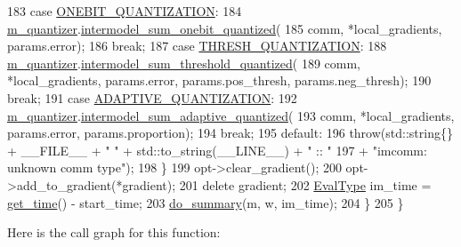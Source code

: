 \begin{DoxyCode}
183     \textcolor{keywordflow}{case} \hyperlink{classlbann_1_1lbann__callback__imcomm_acf7e894b3381e7f9b71020dc73594d6aa06f19090efbd982638c20bcb8a3c7d33}{ONEBIT\_QUANTIZATION}:
184       \hyperlink{classlbann_1_1lbann__callback__imcomm_a4994863d7f69e801c042c5d460bb3f34}{m\_quantizer}.\hyperlink{classlbann_1_1lbann__quantizer_a4b326de1ca5b7eba6415b6f42f83335b}{intermodel\_sum\_onebit\_quantized}(
185         comm, *local\_gradients, params.error);
186       \textcolor{keywordflow}{break};
187     \textcolor{keywordflow}{case} \hyperlink{classlbann_1_1lbann__callback__imcomm_acf7e894b3381e7f9b71020dc73594d6aa76420a96a3df1d5b60140bab6bc32dc4}{THRESH\_QUANTIZATION}:
188       \hyperlink{classlbann_1_1lbann__callback__imcomm_a4994863d7f69e801c042c5d460bb3f34}{m\_quantizer}.\hyperlink{classlbann_1_1lbann__quantizer_a0bd572557675705c5e080b92d74b02ae}{intermodel\_sum\_threshold\_quantized}(
189         comm, *local\_gradients, params.error, params.pos\_thresh, params.neg\_thresh);
190       \textcolor{keywordflow}{break};
191     \textcolor{keywordflow}{case} \hyperlink{classlbann_1_1lbann__callback__imcomm_acf7e894b3381e7f9b71020dc73594d6aaeb95973ab89fc579b91554cd783031b7}{ADAPTIVE\_QUANTIZATION}:
192       \hyperlink{classlbann_1_1lbann__callback__imcomm_a4994863d7f69e801c042c5d460bb3f34}{m\_quantizer}.\hyperlink{classlbann_1_1lbann__quantizer_a87e856d8bf5e8a678a39cdb8f547dfd9}{intermodel\_sum\_adaptive\_quantized}(
193         comm, *local\_gradients, params.error, params.proportion);
194       \textcolor{keywordflow}{break};
195     \textcolor{keywordflow}{default}:
196       \textcolor{keywordflow}{throw}(std::string\{\} + \_\_FILE\_\_ + \textcolor{stringliteral}{" "} + std::to\_string(\_\_LINE\_\_) + \textcolor{stringliteral}{" :: "}
197          + \textcolor{stringliteral}{"imcomm: unknown comm type"});
198     \}
199     opt->clear\_gradient();
200     opt->add\_to\_gradient(*gradient);
201     \textcolor{keyword}{delete} gradient;
202     \hyperlink{base_8hpp_a3266f5ac18504bbadea983c109566867}{EvalType} im\_time = \hyperlink{namespacelbann_a478d36031ff0659893c4322cd856157f}{get\_time}() - start\_time;
203     \hyperlink{classlbann_1_1lbann__callback__imcomm_ad45c39a7a85fb8e1d99eca97aa4d9d09}{do\_summary}(m, w, im\_time);
204   \}
205 \}
\end{DoxyCode}
Here is the call graph for this function\+:\nopagebreak
